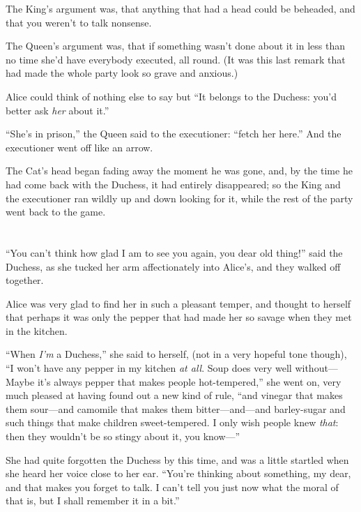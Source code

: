 \documentclass[book, 20pt]{extbook}
\begin{document}
The King's argument was, that anything that had a head could be
beheaded, and that you weren't to talk nonsense.

The Queen's argument was, that if something wasn't done about it in less
than no time she'd have everybody executed, all round. (It was this last
remark that had made the whole party look so grave and anxious.)

Alice could think of nothing else to say but ``It belongs to the
Duchess: you'd better ask \emph{her} about it.''

``She's in prison,'' the Queen said to the executioner: ``fetch her
here.'' And the executioner went off like an arrow.

The Cat's head began fading away the moment he was gone, and, by the
time he had come back with the Duchess, it had entirely disappeared; so
the King and the executioner ran wildly up and down looking for it,
while the rest of the party went back to the game.

\chapter*{}


``You can't think how glad I am to see you again, you dear old thing!''
said the Duchess, as she tucked her arm affectionately into Alice's, and
they walked off together.

Alice was very glad to find her in such a pleasant temper, and thought
to herself that perhaps it was only the pepper that had made her so
savage when they met in the kitchen.

``When \emph{I'm} a Duchess,'' she said to herself, (not in a very
hopeful tone though), ``I won't have any pepper in my kitchen \emph{at
all}. Soup does very well without---Maybe it's always pepper that makes
people hot-tempered,'' she went on, very much pleased at having found
out a new kind of rule, ``and vinegar that makes them sour---and
camomile that makes them bitter---and---and barley-sugar and such things
that make children sweet-tempered. I only wish people knew \emph{that}:
then they wouldn't be so stingy about it, you know---''

She had quite forgotten the Duchess by this time, and was a little
startled when she heard her voice close to her ear. ``You're thinking
about something, my dear, and that makes you forget to talk. I can't
tell you just now what the moral of that is, but I shall remember it in
a bit.''
\end{document}

